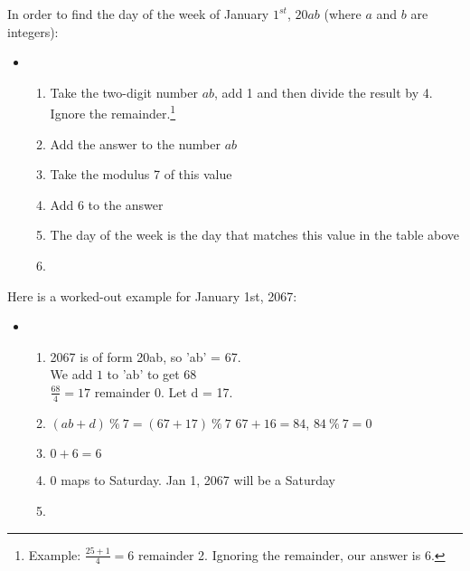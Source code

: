 \documentclass{article}
\begin{document}
    In order to find the day of the week of January $1^{st}$, $20ab$ 
    (where $a$ and $b$ are integers):
    \begin{itemize} \item[] \begin{enumerate}
      \item Take the two-digit number $ab$, add 1 and then divide the result by 4. 
            Ignore the remainder.\footnote{Example: $\frac{25 + 1}{4} = 6$ remainder 2. 
            Ignoring the remainder, our answer is 6.}
      \item Add the answer to the number $ab$
      \item Take the modulus 7 of this value
      \item Add 6 to the answer
      \item The day of the week is the day that matches this value in the table above
      \item[]
    \end{enumerate}\end{itemize}

    Here is a worked-out example for January 1st, 2067:
    \begin{itemize} \item[] \begin{enumerate}
      \item 2067 is of form 20ab, so 'ab' = 67.\\
            We add $1$ to 'ab' to get 68 \\
            $\frac{68}{4} = 17$ remainder 0. Let d = 17.
      \item $(ab + d) \ \% \ 7 = (67 + 17) \ \% \ 7$
            $67 + 16 = 84$, $84 \ \% \ 7 = 0$
      \item $0 + 6 = 6$
      \item 0 maps to Saturday. Jan 1, 2067 will be a Saturday
      \item[]
    \end{enumerate}\end{itemize}

    \begin{center}
    \end{center}
\end{document}
